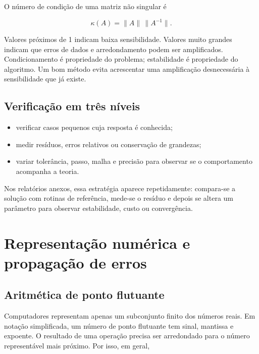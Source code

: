 \documentclass[12pt,a4paper,openany]{book}
\begin{document}
O número de condição de uma matriz não singular é



\[\kappa(A)=\|A\|\,\|A^{-1}\|.\]



Valores próximos de 1 indicam baixa sensibilidade. Valores muito grandes indicam que erros de dados e arredondamento podem ser amplificados. Condicionamento é propriedade do problema; estabilidade é propriedade do algoritmo. Um bom método evita acrescentar uma amplificação desnecessária à sensibilidade que já existe.



\section{Verificação em três níveis}



\begin{itemize}
\item verificar casos pequenos cuja resposta é conhecida;
\item medir resíduos, erros relativos ou conservação de grandezas;
\item variar tolerância, passo, malha e precisão para observar se o comportamento acompanha a teoria.
\end{itemize}



Nos relatórios anexos, essa estratégia aparece repetidamente: compara-se a solução com rotinas de referência, mede-se o resíduo e depois se altera um parâmetro para observar estabilidade, custo ou convergência.



\chapter{Representação numérica e propagação de erros}



\section{Aritmética de ponto flutuante}



Computadores representam apenas um subconjunto finito dos números reais. Em notação simplificada, um número de ponto flutuante tem sinal, mantissa e expoente. O resultado de uma operação precisa ser arredondado para o número representável mais próximo. Por isso, em geral,
\end{document}
